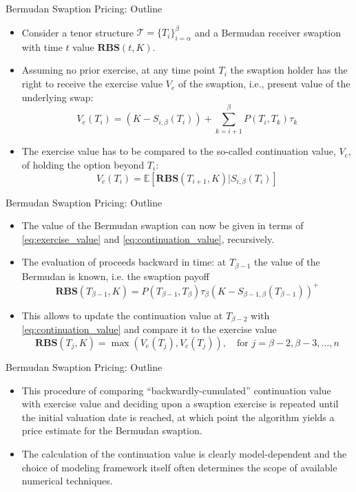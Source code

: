 \documentclass{beamer}
\begin{document}
\begin{frame}{Bermudan Swaption Pricing: Outline}
	\begin{itemize}
	\item Consider a tenor structure $\mathcal{T}=\{T_i\}^\beta_{i=\alpha}$ and a Bermudan receiver swaption with time $t$ value $\textbf{RBS}(t,K)$.
	\item Assuming no prior exercise, at any time point $T_i$ the swaption holder has the right to receive the exercise value $V_e$ of the swaption, i.e., present value of the underlying swap:
	\begin{equation}
	V_e(T_i)=(K-S_{i,\beta}(T_i))+\sum^\beta_{k=i+1} P(T_i,T_k)\tau_k
	\label{eq:exercise_value}
	\end{equation}
	\item The exercise value has to be compared to the so-called continuation value, $V_c$, of holding the option beyond $T_i$:
	\begin{equation}
	V_c(T_i)=\mathbb{E}[\textbf{RBS}(T_{i+1},K)|S_{i,\beta}(T_i)]
	\label{eq:continuation_value}
	\end{equation}
\end{itemize}
\end{frame}

\begin{frame}{Bermudan Swaption Pricing: Outline}
	\begin{itemize}
		\item The value of the Bermudan swaption can now be given in terms of \cref{eq:exercise_value} and \cref{eq:continuation_value}, recursively.
		\item The evaluation of proceeds backward in time: at $T_{\beta-1}$
		the value of the Bermudan is known, i.e. the swaption payoff
		\begin{equation*}
			\textbf{RBS}(T_{\beta-1},K)=P(T_{\beta-1},T_\beta)\tau_\beta(K-S_{\beta-1,\beta}(T_{\beta-1}))^+
		\end{equation*}
		\item This allows to update the continuation value at $T_{\beta-2}$ with \cref{eq:continuation_value} and compare it to the exercise value
		\begin{equation*}
			\textbf{RBS}(T_j,K)=\max(V_e(T_j),V_c(T_j)),\quad\text{for }j=\beta-2,\beta-3,\ldots,n
		\end{equation*}
	\end{itemize}
\end{frame}

\begin{frame}{Bermudan Swaption Pricing: Outline}
	\begin{itemize}
		\item This procedure of comparing “backwardly-cumulated” continuation value with exercise value and deciding upon a swaption exercise is repeated until the initial valuation date is reached, at which point the algorithm yields a price estimate for the Bermudan swaption. 
		\item The calculation of the continuation value is clearly model-dependent and the choice of modeling framework itself often determines the scope of available numerical techniques.
\end{itemize}
\end{frame}
\end{document}
